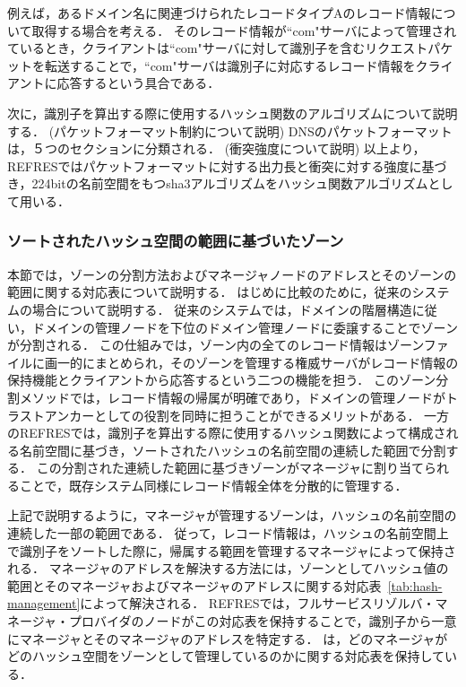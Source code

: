 例えば，あるドメイン名に関連づけられたレコードタイプAのレコード情報について取得する場合を考える．
そのレコード情報が``com"サーバによって管理されているとき，クライアントは``com"サーバに対して識別子を含むリクエストパケットを転送することで，``com"サーバは識別子に対応するレコード情報をクライアントに応答するという具合である．

次に，識別子を算出する際に使用するハッシュ関数のアルゴリズムについて説明する．
(パケットフォーマット制約について説明)
DNSのパケットフォーマットは，５つのセクションに分類される．
(衝突強度について説明)
以上より，REFRESではパケットフォーマットに対する出力長と衝突に対する強度に基づき，224bitの名前空間をもつsha3アルゴリズムをハッシュ関数アルゴリズムとして用いる．


\subsubsection{ソートされたハッシュ空間の範囲に基づいたゾーン}
本節では，ゾーンの分割方法およびマネージャノードのアドレスとそのゾーンの範囲に関する対応表について説明する．
はじめに比較のために，従来のシステムの場合について説明する．
従来のシステムでは，ドメインの階層構造に従い，ドメインの管理ノードを下位のドメイン管理ノードに委譲することでゾーンが分割される．
この仕組みでは，ゾーン内の全てのレコード情報はゾーンファイルに画一的にまとめられ，そのゾーンを管理する権威サーバがレコード情報の保持機能とクライアントから応答するという二つの機能を担う．
このゾーン分割メソッドでは，レコード情報の帰属が明確であり，ドメインの管理ノードがトラストアンカーとしての役割を同時に担うことができるメリットがある．
一方のREFRESでは，識別子を算出する際に使用するハッシュ関数によって構成される名前空間に基づき，ソートされたハッシュの名前空間の連続した範囲で分割する．
この分割された連続した範囲に基づきゾーンがマネージャに割り当てられることで，既存システム同様にレコード情報全体を分散的に管理する．

上記で説明するように，マネージャが管理するゾーンは，ハッシュの名前空間の連続した一部の範囲である．
従って，レコード情報は，ハッシュの名前空間上で識別子をソートした際に，帰属する範囲を管理するマネージャによって保持される．
マネージャのアドレスを解決する方法には，ゾーンとしてハッシュ値の範囲とそのマネージャおよびマネージャのアドレスに関する対応表~\ref{tab:hash-management}によって解決される．
REFRESでは，フルサービスリゾルバ・マネージャ・プロバイダのノードがこの対応表を保持することで，識別子から一意にマネージャとそのマネージャのアドレスを特定する．
は，どのマネージャがどのハッシュ空間をゾーンとして管理しているのかに関する対応表を保持している．


